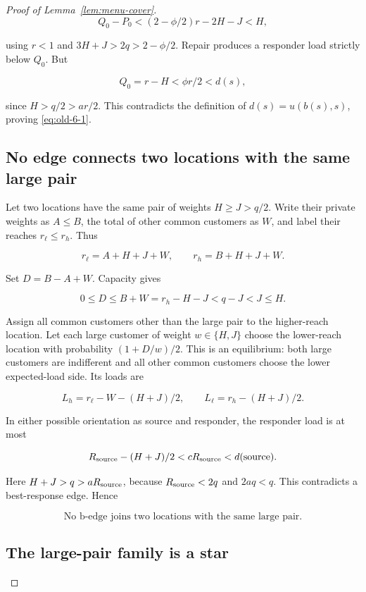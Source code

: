 \documentclass[11pt]{amsart}
\numberwithin{equation}{section}
\theoremstyle{definition}
\begin{document}
\begin{proof}[Proof of Lemma~\ref{lem:menu-cover}]
\[
Q_0-P_0<(2-\phi/2)r-2H-J<H,
\]

using \(r<1\) and \(3H+J>2q>2-\phi/2\). Repair produces a responder load strictly below \(Q_0\). But

\[
Q_0=r-H<\phi r/2<d(s),
\]

since \(H>q/2>ar/2\). This contradicts the definition of \(d(s)=u(b(s),s)\), proving \eqref{eq:old-6-1}.


\subsection{No edge connects two locations with the same large pair}\label{no-edge-connects-two-locations-with-the-same-large-pair}

Let two locations have the same pair of weights \(H\ge J>q/2\). Write their private weights as \(A\le B\), the total of other common customers as \(W\), and label their reaches \(r_\ell\le r_h\). Thus

\[
r_\ell=A+H+J+W,\qquad r_h=B+H+J+W.
\]

Set \(D=B-A+W\). Capacity gives

\[
0\le D\le B+W=r_h-H-J<q-J<J\le H.
\]

Assign all common customers other than the large pair to the higher-reach location. Let each large customer of weight \(w\in\{H,J\}\) choose the lower-reach location with probability \((1+D/w)/2\). This is an equilibrium: both large customers are indifferent and all other common customers choose the lower expected-load side. Its loads are

\[
L_h=r_\ell-W-(H+J)/2,\qquad L_\ell=r_h-(H+J)/2.
\]

In either possible orientation as source and responder, the responder load is at most

\[
R_{\rm source}-(H+J)/2<cR_{\rm source}<d({\rm source}).
\]

Here \(H+J>q>aR_{\rm source}\), because \(R_{\rm source}<2q\) and \(2aq<q\). This contradicts a best-response edge. Hence

\begin{equation}
\boxed{\text{No b-edge joins two locations with the same large pair.}} \label{eq:old-7-1}
\end{equation}




\subsection{The large-pair family is a star}\label{the-large-pair-family-is-a-star}


\end{proof}
\end{document}
